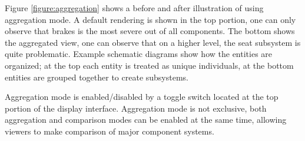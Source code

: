 Figure \ref{figure:aggregation} shows a before and after illustration of using
aggregation mode. A default rendering is shown in the top portion, one can
only observe that brakes is the most severe out of all components. The bottom
shows the aggregated view, one can observe that on a higher level, the seat
subsystem is quite problematic. Example schematic diagrams show how the entities
are organized; at the top each entity is treated as unique individuals, at the
bottom entities are grouped together to create subsystems.
 
Aggregation mode is enabled/disabled by a toggle switch located at the top
portion of the display interface. Aggregation mode is not exclusive, both aggregation
and comparison modes can be enabled at the same time, allowing viewers to make comparison
of major component systems.
